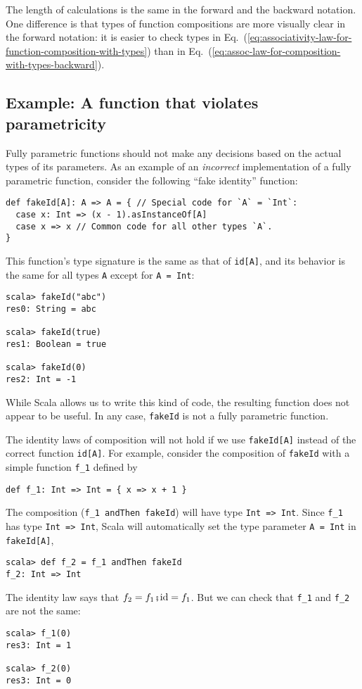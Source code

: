 The length of calculations is the same in the forward and the backward
notation. One difference is that types of function compositions are
more visually clear in the forward notation: it is easier to check
types in Eq.~(\ref{eq:associativity-law-for-function-composition-with-types})
than in Eq.~(\ref{eq:assoc-law-for-composition-with-types-backward}).

\subsection{Example: A function that violates parametricity }

Fully parametric functions should not make any decisions based on
the actual types of its parameters. As an example of an \emph{incorrect}
implementation of a fully parametric function, consider the following
``fake identity'' function:
\begin{lstlisting}
def fakeId[A]: A => A = { // Special code for `A` = `Int`:
  case x: Int => (x - 1).asInstanceOf[A]
  case x => x // Common code for all other types `A`.
}
\end{lstlisting}
This function's type signature is the same as that of \lstinline!id[A]!,
and its behavior is the same for all types \lstinline!A! except for
\lstinline!A = Int!:
\begin{lstlisting}
scala> fakeId("abc")
res0: String = abc

scala> fakeId(true)
res1: Boolean = true

scala> fakeId(0)
res2: Int = -1
\end{lstlisting}
While Scala allows us to write this kind of code, the resulting function
does not appear to be useful. In any case, \lstinline!fakeId! is
not a fully parametric function.

The identity laws of composition will not hold if we use \lstinline!fakeId[A]!
instead of the correct function \lstinline!id[A]!. For example, consider
the composition of \lstinline!fakeId! with a simple function \lstinline!f_1!
defined by
\begin{lstlisting}
def f_1: Int => Int = { x => x + 1 }
\end{lstlisting}
The composition (\lstinline!f_1 andThen fakeId!) will have type \lstinline!Int => Int!.
Since \lstinline!f_1! has type \lstinline!Int => Int!, Scala will
automatically set the type parameter \lstinline!A = Int! in \lstinline!fakeId[A]!,
\begin{lstlisting}
scala> def f_2 = f_1 andThen fakeId
f_2: Int => Int
\end{lstlisting}
The identity law says that $f_{2}=f_{1}\bef\text{id}=f_{1}$. But
we can check that \lstinline!f_1! and \lstinline!f_2! are not the
same:
\begin{lstlisting}
scala> f_1(0)
res3: Int = 1

scala> f_2(0)
res3: Int = 0
\end{lstlisting}

